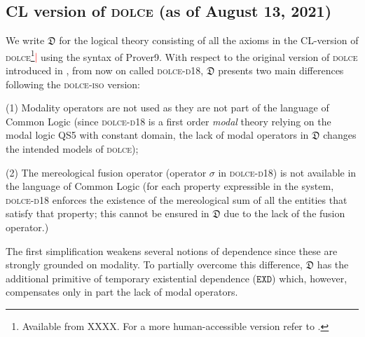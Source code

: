 \documentclass[ao]{iosart2x}
\newcommand{\nb}[1]{\textcolor{red}{$|$}\marginpar{\hspace*{-0cm}\parbox{20mm}{\scriptsize\raggedright\textcolor{red}{#1}}}}
\newcommand{\bflist}{\begin{list}{}{\setlength{\topsep}{2mm}\setlength{\parsep}{0mm}\setlength{\leftmargin}{9.2mm}\setlength{\labelwidth}{8mm}}}
\newcommand{\eflist}{\end{list}}
\newcommand{\dolceDefLabel}{\textrm{d$_\texttt{d}$}}
\newcommand{\refdolcedf}[1]{({\dolceDefLabel}\ref{#1})}
\newcommand{\pr}[1]{\mathtt{#1}}
\newcommand{\dolce}{{\textsc{dolce}}}
\newcommand{\dolceorig}{{\textsc{dolce-d{\footnotesize 18}}}}
\newcommand {\thdolce} {\ensuremath{\mathfrak{D}}}
\newcommand {\SDd} {\ensuremath{\pr{SD}}}
\newcommand {\EXDd} {\ensuremath{\pr{EXD}}}
\begin{document}
\subsection{CL version of {\dolce} (as of August 13, 2021) }\label{sect_dolce}

%
%
%
We write $\thdolce$ for the logical theory consisting of all the axioms in the CL-version of {\dolce}\footnote{Available from {\color{red} XXXX}. For a more human-accessible version refer to \citep[ch.2]{D24}.}\nb{add sito web in footnote} using the syntax of Prover9. With respect to the original version of {\dolce} introduced in \citep{D18}, from now on called {\dolceorig},
$\thdolce$ presents two main differences following the {\dolce-\textsc{iso}} version:
\bflist
\item[(1)] Modality operators are not used as they are not part of the language of Common Logic (since {\dolceorig} is a first order {\em modal} theory relying on the modal logic QS5 with constant domain, the lack of modal operators in $\thdolce$ changes the intended models of {\dolce}); 
\item[(2)] The mereological fusion operator (operator $\sigma$ in {\dolceorig}) is not available in the language of Common Logic (for each property expressible in the system, {\dolceorig} enforces the existence of the mereological sum of all the entities that satisfy that property; this cannot be ensured in $\thdolce$ due to the lack of the fusion operator.)
\eflist

The first simplification weakens several notions of dependence since these are strongly grounded on modality. To partially overcome this difference, $\thdolce$ has the additional primitive of temporary existential dependence ($\EXDd$) which, however, compensates only in part the lack of modal operators. %
\end{document}
